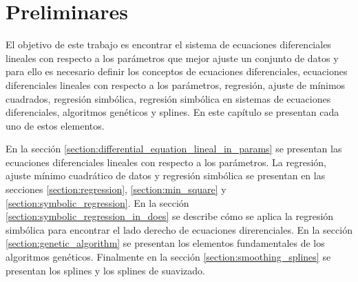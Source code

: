 \chapter{Preliminares}\label{chapter:preliminaries}

El objetivo de este trabajo es encontrar el sistema de ecuaciones diferenciales lineales con respecto a los parámetros que mejor ajuste un conjunto de datos y para ello es necesario definir los conceptos de ecuaciones diferenciales, ecuaciones diferenciales lineales con respecto a los parámetros, regresión, ajuste de mínimos cuadrados, regresión simbólica, regresión simbólica en sistemas de ecuaciones diferenciales, algoritmos genéticos y splines. En este capítulo se presentan cada uno de estos elementos.

En la sección \ref{section:differential_equation_lineal_in_params} se presentan las ecuaciones diferenciales lineales con respecto a los parámetros. La regresión, ajuste mínimo cuadrático de datos y regresión simbólica se presentan en las secciones \ref{section:regression}, \ref{section:min_square} y \ref{section:symbolic_regression}. En la sección \ref{section:symbolic_regression_in_does} se describe cómo se aplica la regresión simbólica para encontrar el lado derecho de ecuaciones direrenciales. En la sección \ref{section:genetic_algorithm} se presentan los elementos fundamentales de los algoritmos genéticos. Finalmente en la sección \ref{section:smoothing_splines} se presentan los splines y los splines de suavizado.


